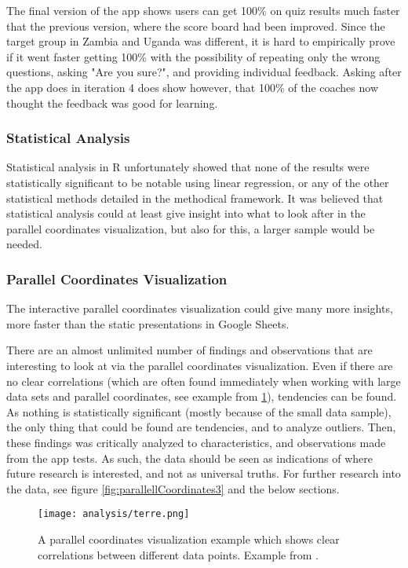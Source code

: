 The final version of the app shows users can get 100\% on quiz results much faster that the previous version, where the score board had been improved. Since the target group in Zambia and Uganda was different, it is hard to empirically prove if it went faster getting 100\% with the possibility of repeating only the wrong questions, asking "Are you sure?", and providing individual feedback. Asking after the app does in iteration 4 does show however, that 100\% of the coaches now thought the feedback was good for learning.

\subsubsection{Statistical Analysis}
Statistical analysis in R unfortunately showed that none of the results were statistically significant to be notable using linear regression, or any of the other statistical methods detailed in the methodical framework. It was believed that statistical analysis could at least give insight into what to look after in the parallel coordinates visualization, but also for this, a larger sample would be needed.

\subsubsection{Parallel Coordinates Visualization}
The interactive parallel coordinates visualization could give many more insights, more faster than the static presentations in Google Sheets.

There are an almost unlimited number of findings and observations that are interesting to look at via the parallel coordinates visualization. Even if there are no clear correlations (which are often found immediately when working with large data sets and parallel coordinates, see example from \ref{fig:terre}), tendencies can be found. As nothing is statistically significant (mostly because of the small data sample), the only thing that could be found are tendencies, and to analyze outliers. Then, these findings was critically analyzed to characteristics, and observations made from the app tests. As such, the data should be seen as indications of where future research is interested, and not as universal truths. For further research into the data, see figure \ref{fig:parallellCoordinates3} and the below sections.

\begin{figure}[h]
    \centering
    \texttt{[image: analysis/terre.png]}
    \caption{A parallel coordinates visualization example which shows clear correlations between different data points. Example from \cite{une-terre}.}
    \label{fig:terre}
\end{figure}

